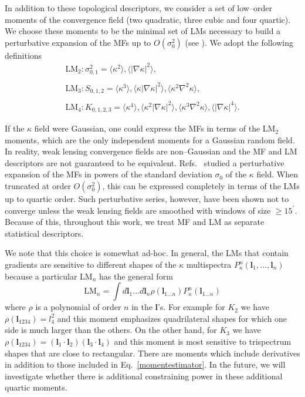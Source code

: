 \documentclass[reprint,aps,prd,superscriptaddress,showkeys,showpacs]{revtex4-1}
\begin{document}
In addition to these topological descriptors, we consider a set of
low--order moments of the convergence field (two quadratic, three
cubic and four quartic). We choose these moments to be the minimal set
of LMs necessary to build a perturbative expansion of the MFs up to
$O(\sigma_0^2)$ (see \citep{Munshi12,Matsubara10}). We adopt the
following definitions
\begin{equation}
\label{momentestimator}
\begin{matrix}
\mathrm{LM_2}: \sigma_{0,1}^2 = \langle\kappa^2\rangle,\langle\vert\nabla\kappa\vert^2\rangle, \\ \\
\mathrm{LM_3}: S_{0,1,2} = \langle\kappa^3\rangle,\langle\kappa\vert\nabla\kappa\vert^2\rangle,\langle\kappa^2\nabla^2\kappa\rangle, \\ \\
\mathrm{LM_4}: K_{0,1,2,3} = \langle\kappa^4\rangle,\langle\kappa^2\vert\nabla\kappa\vert^2\rangle,\langle\kappa^3\nabla^2\kappa\rangle,\langle\vert\nabla\kappa\vert^4\rangle.
\end{matrix}
\end{equation}

If the $\kappa$ field were Gaussian, one could express the MFs in
terms of the LM$_2$ moments, which are the only independent moments
for a Gaussian random field. In reality, weak lensing convergence
fields are non--Gaussian and the MF and LM descriptors are not
guaranteed to be equivalent. Refs.~\citep{Munshi12,Matsubara10}
studied a perturbative expansion of the MFs in powers of the standard
deviation $\sigma_0$ of the $\kappa$ field. When truncated at order
$O(\sigma_0^2)$, this can be expressed completely in terms of the LMs
up to quartic order. Such perturbative series, however, have been
shown not to converge \citep{Petri2013} unless the weak lensing fields
are smoothed with windows of size $\geq 15^\prime$. Because of this,
throughout this work, we treat MF and LM as separate statistical
descriptors.

We note that this choice is somewhat ad-hoc. In general, the LMs that
contain gradients are sensitive to different shapes of the $\kappa$
multispectra $P_{\kappa}^n(\mathbf{l}_1,...,\mathbf{l}_n)$ because a
particular $\mathrm{LM}_n$ has the general form
\begin{equation}
\mathrm{LM}_n = \int d\mathbf{l}_1...d\mathbf{l}_n \rho(\mathbf{l}_{1...n})P^n_{\kappa}(\mathbf{l}_{1...n})
\end{equation}
where $\rho$ is a polynomial of order $n$ in the $\mathbf{l}$'s. For
example for $K_2$ we have $\rho(\mathbf{l}_{1234})=l_4^2$ and this
moment emphasizes quadrilateral shapes for which one side is much
larger than the others. On the other hand, for $K_3$ we have
$\rho(\mathbf{l}_{1234})=(\mathbf{l}_1\cdot\mathbf{l}_2)(\mathbf{l}_3\cdot\mathbf{l}_4)$
and this moment is most sensitive to trispectrum shapes that are close
to rectangular. There are moments which include derivatives in
addition to those included in Eq.~\ref{momentestimator}. In the
future, we will investigate whether there is additional constraining
power in these additional quartic moments.
\end{document}
